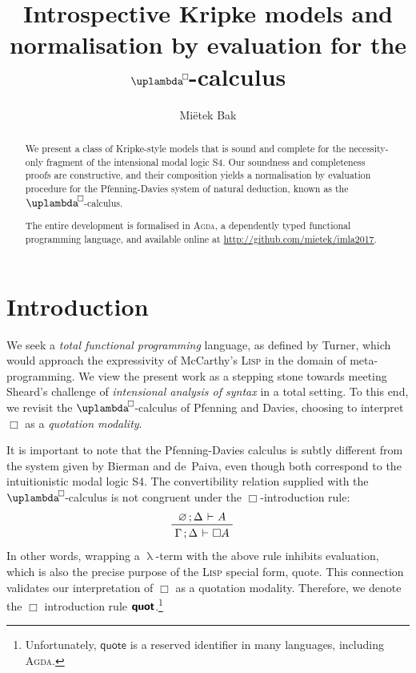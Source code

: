 \documentclass[submission,copyright,creativecommons,sharealike,backref=page]{eptcs}
\title{Introspective Kripke models and\\
       normalisation by evaluation for the $\uplambdabox$-calculus}
\author{Mi{\"e}tek Bak
\email{\textrm{\normalsize{\href{mailto:mietek@bak.io}{mietek@bak.io}}}}}
\newcommand{\uplambdabox}{\uplambda^{\mkern-3mu\Box\mkern-3mu}}
\renewcommand{\:}{\mathop{\mkern3mu:\mkern3mu}}
\renewcommand{\.}{\mathop{\mkern3mu.\mkern3mu}}
\renewcommand{\;}{\mathop{;}}
\renewcommand{\,}{\mathop{,}}
\newcommand{\e}{\mathrel{\mkern2mu\vdash\mkern1mu}}
\newcommand{\quot}{\operatorname{\textsf{\textbf{quot}}}}
\renewcommand{\O}{\varnothing}
\theoremstyle{mystyle}
\begin{document}
\maketitle

\begin{abstract}
We present a class of Kripke-style models that is sound and complete for the necessity-only fragment of the intensional modal logic S4.  Our soundness and completeness proofs are constructive, and their composition yields a normalisation by evaluation procedure for the Pfenning-Davies system of natural deduction, known as the $\uplambdabox$-calculus.

The entire development is formalised in \textsc{Agda}, a dependently typed functional programming language, and available online at \href{http://github.com/mietek/imla2017}{http://github.com/mietek/imla2017}.
\end{abstract}


\section*{Introduction}

We seek a \emph{total functional programming} language, as defined by Turner\cite{Turner04}, which would approach the expressivity of McCarthy's\cite{McCarthyAEHL62} \textsc{Lisp} in the domain of meta-programming.  We view the present work as a stepping stone towards meeting Sheard's\cite{Sheard01} challenge of \emph{intensional analysis of syntax} in a total setting.  To this end, we revisit the $\uplambdabox$-calculus of Pfenning and Davies\cite{PfenningD01}, choosing to interpret $\Box$ as a \emph{quotation modality}.

It is important to note that the Pfenning-Davies calculus is subtly different from the system given by Bierman and de~Paiva\cite{BiermanP00}, even though both correspond to the intuitionistic modal logic S4.  The convertibility relation supplied with the $\uplambdabox$-calculus is not congruent under the $\Box$-introduction rule:
\begin{align*}
  & \prftree
     {\O \; \Delta \e A}
     {\Gamma \; \Delta \e \Box A}
\end{align*}
In other words, wrapping a $\uplambda$-term with the above rule inhibits evaluation, which is also the precise purpose of the \textsc{Lisp} special form, \textsf{quote}.  This connection validates our interpretation of $\Box$ as a quotation modality.  Therefore, we denote the $\Box$ introduction rule $\quot$.\footnote{Unfortunately, $\textsf{quote}$ is a reserved identifier in many languages, including \textsc{Agda}.}
\end{document}

